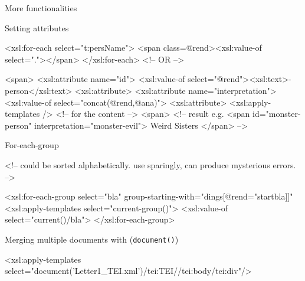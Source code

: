 \begin{frame}{More functionalities}
\framebreak

\begin{block}{Setting attributes}
\begin{xmlcode}
<xsl:for-each select="t:persName">
    <span class={@rend}><xsl:value-of select="."></span>
</xsl:for-each>
<!-- OR -->

<span>
    <xsl:attribute name="id">
        <xsl:value-of select="@rend"><xsl:text>-person</xsl:text>
    <xsl:attribute>
    <xsl:attribute name="interpretation">
        <xsl:value-of select="concat(@rend,@ana)">
    <xsl:attribute>
    <xsl:apply-templates /> <!-- for the content -->
<span>
<!-- result e.g. 
    <span id="monster-person" interpretation="monster-evil">
    Weird Sisters </span> -->
\end{xmlcode}
\end{block}

\begin{block}{For-each-group}
\begin{xmlcode}

<!-- could be sorted alphabetically.
     use sparingly, can produce mysterious errors. -->

<xsl:for-each-group select="bla" 
  group-starting-with="dings[@rend="startbla]]"
    <xsl:apply-templates select="current-group()">
    <xsl:value-of select="current()/bla">
</xsl:for-each-group>

\end{xmlcode}
\end{block}

\begin{block}{Merging multiple documents with (\texttt{document()})}
\begin{xmlcode}
<xsl:apply-templates 
  select="document('Letter1_TEI.xml')/tei:TEI//tei:body/tei:div"/>
\end{xmlcode}
\end{block}
\end{frame}

